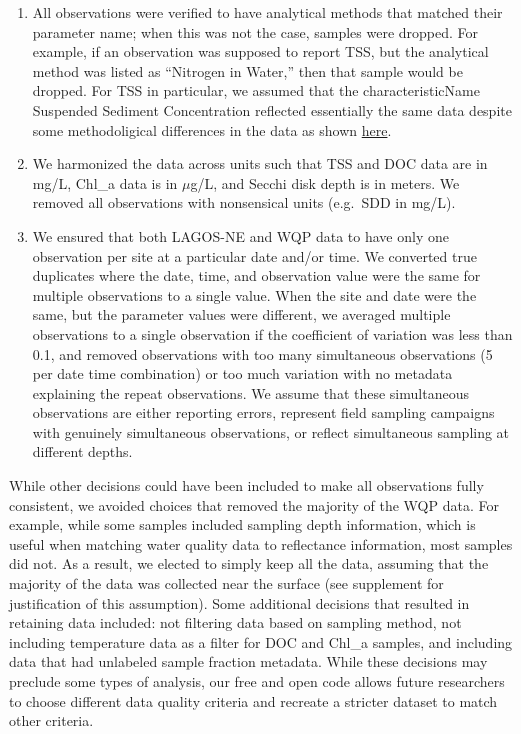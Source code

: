 \documentclass[]{article}
\begin{document}
\begin{enumerate}
\def\labelenumi{\arabic{enumi}.}
\item
  All observations were verified to have analytical methods that matched
  their parameter name; when this was not the case, samples were
  dropped. For example, if an observation was supposed to report TSS,
  but the analytical method was listed as ``Nitrogen in Water,'' then
  that sample would be dropped. For TSS in particular, we assumed that
  the characteristicName Suspended Sediment Concentration reflected
  essentially the same data despite some methodoligical differences in
  the data as shown
  \href{https://water.usgs.gov/osw/pubs/WRIR00-4191.pdf}{here}.
\item
  We harmonized the data across units such that TSS and DOC data are in
  mg/L, Chl\_a data is in \(\mu\)g/L, and Secchi disk depth is in
  meters. We removed all observations with nonsensical units (e.g.~SDD
  in mg/L).
\item
  We ensured that both LAGOS-NE and WQP data to have only one
  observation per site at a particular date and/or time. We converted
  true duplicates where the date, time, and observation value were the
  same for multiple observations to a single value. When the site and
  date were the same, but the parameter values were different, we
  averaged multiple observations to a single observation if the
  coefficient of variation was less than 0.1, and removed observations
  with too many simultaneous observations (5 per date time combination)
  or too much variation with no metadata explaining the repeat
  observations. We assume that these simultaneous observations are
  either reporting errors, represent field sampling campaigns with
  genuinely simultaneous observations, or reflect simultaneous sampling
  at different depths.
\end{enumerate}

While other decisions could have been included to make all observations
fully consistent, we avoided choices that removed the majority of the
WQP data. For example, while some samples included sampling depth
information, which is useful when matching water quality data to
reflectance information, most samples did not. As a result, we elected
to simply keep all the data, assuming that the majority of the data was
collected near the surface (see supplement for justification of this
assumption). Some additional decisions that resulted in retaining data
included: not filtering data based on sampling method, not including
temperature data as a filter for DOC and Chl\_a samples, and including
data that had unlabeled sample fraction metadata. While these decisions
may preclude some types of analysis, our free and open code allows
future researchers to choose different data quality criteria and
recreate a stricter dataset to match other criteria.
\end{document}
